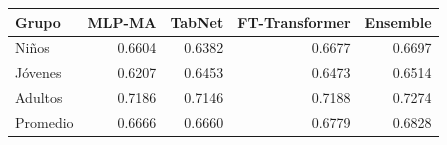 \begin{tabular}{lrrrr}
\toprule
Grupo & MLP-MA & TabNet & FT-Transformer & Ensemble \\
\midrule
Niños & 0.6604 & 0.6382 & 0.6677 & 0.6697 \\
Jóvenes & 0.6207 & 0.6453 & 0.6473 & 0.6514 \\
Adultos & 0.7186 & 0.7146 & 0.7188 & 0.7274 \\
Promedio & 0.6666 & 0.6660 & 0.6779 & 0.6828 \\
\bottomrule
\end{tabular}
